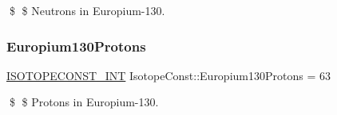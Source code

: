 \$ \$ Neutrons in Europium-\/130. \mbox{\label{group___isotope_const-_europium-_eu130_gab05330ec1972e5738b3924473ac970cc}} 
\subsubsection{\texorpdfstring{Europium130\+Protons}{Europium130Protons}}
{\footnotesize\ttfamily \mbox{\hyperlink{group___isotope_const-_macros_ga5f18360b3e99483a35c32d789e62621c}{I\+S\+O\+T\+O\+P\+E\+C\+O\+N\+S\+T\+\_\+\+I\+NT}} Isotope\+Const\+::\+Europium130\+Protons = 63}

\$ \$ Protons in Europium-\/130. 